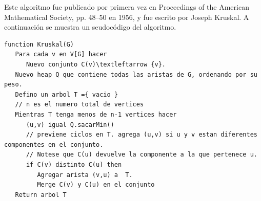 Este algoritmo fue publicado por primera vez en Proceedings of the American Mathematical Society, pp. 48–50 en 1956, y fue escrito por Joseph Kruskal. A continuación se muestra un seudocódigo del algoritmo.

\begin{lstlisting}
function Kruskal(G)
   Para cada v en V[G] hacer
      Nuevo conjunto C(v)\textleftarrow {v}.
   Nuevo heap Q que contiene todas las aristas de G, ordenando por su peso.
   Defino un arbol T ={ vacio }     
   // n es el numero total de vertices
   Mientras T tenga menos de n-1 vertices hacer
      (u,v) igual Q.sacarMin()
      // previene ciclos en T. agrega (u,v) si u y v estan diferentes componentes en el conjunto. 
      // Notese que C(u) devuelve la componente a la que pertenece u.
      if C(v) distinto C(u) then
         Agregar arista (v,u) a  T.
         Merge C(v) y C(u) en el conjunto
   Return arbol T
\end{lstlisting} 
